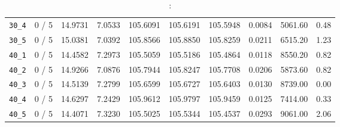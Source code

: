 \documentclass{scrartcl}
\begin{document}
\begin{table}[h!]
\begin{center}
\begin{tabular}{| c | c | c | c | c | c | c | c | c | c |}
\verb|30_4| & 0 / 5 & 14.9731 & 7.0533 & 105.6091 & 105.6191 & 105.5948 & 0.0084 & 5061.60 & 0.48\\ 
\verb|30_5| & 0 / 5 & 15.0381 & 7.0392 & 105.8566 & 105.8850 & 105.8259 & 0.0211 & 6515.20 & 1.23\\ 
\verb|40_1| & 0 / 5 & 14.4582 & 7.2973 & 105.5059 & 105.5186 & 105.4864 & 0.0118 & 8550.20 & 0.82\\ 
\verb|40_2| & 0 / 5 & 14.9266 & 7.0876 & 105.7944 & 105.8247 & 105.7708 & 0.0206 & 5873.60 & 0.82\\ 
\verb|40_3| & 0 / 5 & 14.5139 & 7.2799 & 105.6599 & 105.6727 & 105.6403 & 0.0130 & 8739.00 & 0.00\\ 
\verb|40_4| & 0 / 5 & 14.6297 & 7.2429 & 105.9612 & 105.9797 & 105.9459 & 0.0125 & 7414.00 & 0.33\\ 
\verb|40_5| & 0 / 5 & 14.4071 & 7.3230 & 105.5025 & 105.5344 & 105.4537 & 0.0293 & 9061.00 & 2.06\\ 
\hline
\end{tabular}
\caption{:}
\label{table:}
\end{center}
\end{table}
\end{document}
